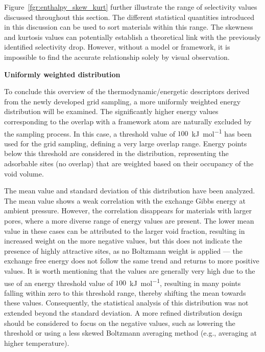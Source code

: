 \documentclass[main]{subfiles}
\begin{document}
Figure~\ref{fgr:enthalpy_skew_kurt} further illustrate the range of selectivity values discussed throughout this section. The different statistical quantities introduced in this discussion can be used to sort materials within this range. The skewness and kurtosis values can potentially establish a theoretical link with the previously identified selectivity drop. However, without a model or framework, it is impossible to find the accurate relationship solely by visual observation.

\textbf{Uniformly weighted distribution}

To conclude this overview of the thermodynamic/energetic descriptors derived from the newly developed grid sampling, a more uniformly weighted energy distribution will be examined. The significantly higher energy values corresponding to the overlap with a framework atom are naturally excluded by the sampling process. In this case, a threshold value of $100$~\si{\kilo\joule\per\mole} has been used for the grid sampling, defining a very large overlap range. Energy points below this threshold are considered in the distribution, representing the adsorbable sites (no overlap) that are weighted based on their occupancy of the void volume.

The mean value and standard deviation of this distribution have been analyzed. The mean value shows a weak correlation with the exchange Gibbs energy at ambient pressure. However, the correlation disappears for materials with larger pores, where a more diverse range of energy values are present. The lower mean value in these cases can be attributed to the larger void fraction, resulting in increased weight on the more negative values, but this does not indicate the presence of highly attractive sites, as no Boltzmann weight is applied  --- the exchange free energy does not follow the same trend and returns to more positive values. It is worth mentioning that the values are generally very high due to the use of an energy threshold value of $100$~\si{\kilo\joule\per\mole}, resulting in many points falling within zero to this threshold range, thereby shifting the mean towards these values. Consequently, the statistical analysis of this distribution was not extended beyond the standard deviation. A more refined distribution design should be considered to focus on the negative values, such as lowering the threshold or using a less skewed Boltzmann averaging method (e.g., averaging at higher temperature).
\end{document}
